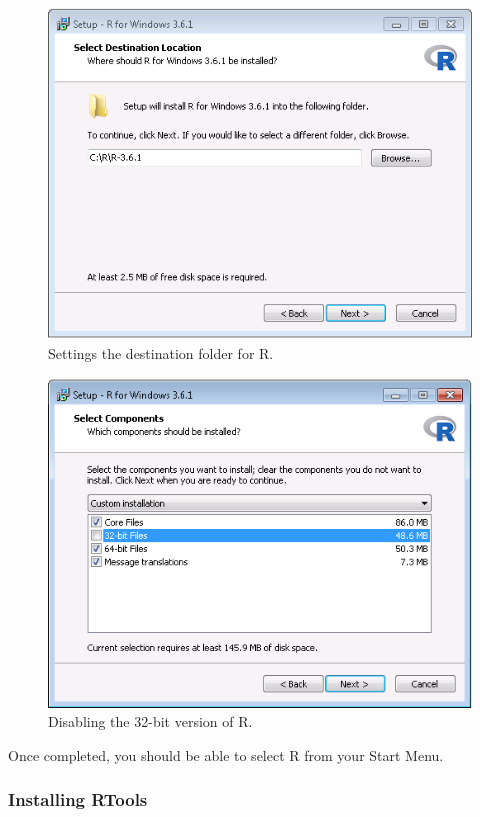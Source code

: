 \documentclass[11pt]{book}
\theoremstyle{definition}
\theoremstyle{definition}
\theoremstyle{definition}
\theoremstyle{remark}
\begin{document}
\begin{figure}

{\centering \includegraphics[width=0.8\linewidth]{images/OhdsiAnalyticsTools/rDestination} 

}

\caption{Settings the destination folder for R.}\label{fig:rDestination}
\end{figure}

\begin{figure}

{\centering \includegraphics[width=0.8\linewidth]{images/OhdsiAnalyticsTools/no32Bits} 

}

\caption{Disabling the 32-bit version of R.}\label{fig:no32Bits}
\end{figure}

Once completed, you should be able to select R from your Start Menu.

\hypertarget{installing-rtools}{%
\subsubsection*{Installing RTools}\label{installing-rtools}}
\end{document}
